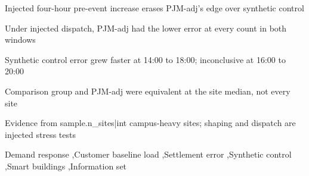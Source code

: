 \begin{frontmatter}
\begin{highlights}
\item Injected four-hour pre-event increase erases PJM-adj's edge over synthetic control
\item Under injected dispatch, PJM-adj had the lower error at every count in both windows
\item Synthetic control error grew faster at 14:00 to 18:00; inconclusive at 16:00 to 20:00
\item Comparison group and PJM-adj were equivalent at the site median, not every site
\item Evidence from {{sample.n_sites|int}} campus-heavy sites; shaping and dispatch are injected stress tests
\end{highlights}

\begin{keyword}
Demand response \sep Customer baseline load \sep Settlement error \sep Synthetic control \sep Smart buildings \sep Information set
\end{keyword}

\end{frontmatter}
